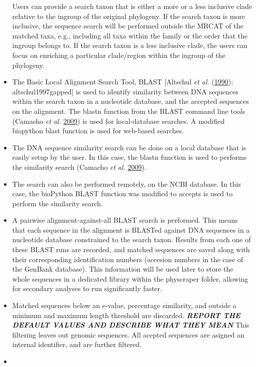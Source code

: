 \documentclass[]{article}
\begin{document}
\begin{itemize}
  Users can provide a search taxon that is either a more or a less inclusive
  clade relative to the ingroup of the original phylogeny. If the search taxon is more inclusive, the sequence search will be performed outside the MRCAT of the matched taxa, e.g., including all taxa within
  the family or the order that the ingroup belongs to. If the search taxon is a less inclusive clade, the users can focus on enriching a particular clade/region within the ingroup of the phylogeny.
\item
  The Basic Local Alignment Search Tool, BLAST {[}Altschul \emph{et al.} (\protect\hyperlink{ref-altschul1990basic}{1990}); altschul1997gapped{]} is used to identify
  similarity between DNA sequences within the search taxon in a nucleotide
  database, and the accepted sequences on the alignment.
  The blastn function from the BLAST command line tools (Camacho \emph{et al.} \protect\hyperlink{ref-camacho2009blast}{2009}) is used for local-database searches.
  A modified biopython blast function is used for web-based searches.
\item
  The DNA sequence similarity search can be done on a local database that is easily
  setup by the user. In this case, the blastn function is used to performs the similarity search (Camacho \emph{et al.} \protect\hyperlink{ref-camacho2009blast}{2009}).
\item
  The search can also be performed remotely, on the NCBI database. In this case, the
  bioPython BLAST function was modified to accepts is used to perform the similarity search.
\item
  A pairwise alignment-against-all BLAST search is performed. This means that each sequence
  in the alignment is BLASTed against DNA sequences in a nucleotide database constrained to the search
  taxon. Results from each one of these BLAST runs are recorded, and matched sequences are saved
  along with their corresponding identification numbers (accesion numbers in the case of the GenBank database). This information will be used later to store the whole sequences in a dedicated library within the physcraper folder, allowing for secondary analyses to run significantly faster.
\item
  Matched sequences below an e-value, percentage similarity, and outside a minimum
  and maximum length threshold are discarded. \textbf{\emph{REPORT THE DEFAULT VALUES AND DESCRIBE WHAT THEY MEAN}} This filtering leaves out genomic sequences.
  All acepted sequences are asigned an internal identifier, and are further filtered.
\item

\end{itemize}
\end{document}
